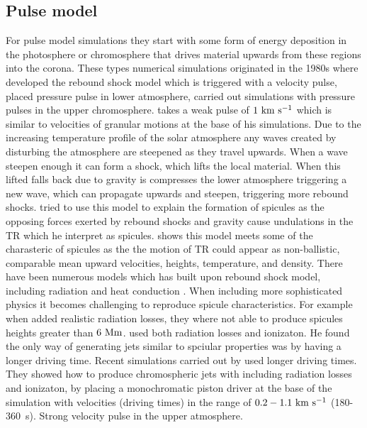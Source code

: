 \subsection{Pulse model}
\label{ssec:pulse_model}
For pulse model simulations they start with some form of energy deposition in the photosphere or chromosphere that drives material upwards from these regions into the corona. These types numerical simulations originated in the 1980s where \cite{Hollweg1982ApJ257345H} developed the rebound shock model which is triggered with a velocity pulse, \cite{Suematsu1982SoPh7599S} placed pressure pulse in lower atmosphere, \cite{Shibata1982} carried out simulations with pressure pulses in the upper chromosphere. \np
%
\cite{Hollweg1982ApJ257345H} takes a weak pulse of $1~\rm{km ~s^{-1}}$ which is similar to velocities of granular motions at the base of his simulations. Due to the increasing temperature profile of the solar atmosphere any waves created by disturbing the atmosphere are steepened as they travel upwards. When a wave steepen enough it can form a shock, which lifts the local material. When this lifted falls back due to gravity is compresses the lower atmosphere triggering a new wave, which can propagate upwards and steepen, triggering more rebound shocks. \cite{Hollweg1982ApJ257345H} tried to use this model to explain the formation of spicules as the opposing forces exerted by rebound shocks and gravity cause undulations in the TR which he interpret as spicules. \cite{Hollweg1982ApJ257345H} shows this model meets some of the charasteric of spicules as the the motion of TR could appear as non-ballistic, comparable mean upward velocities, heights, temperature, and density. There have been numerous models which has built upon rebound shock model, including radiation and heat conduction \citep{Sterling1988ApJ327950S, Sterling1990ApJ349647S, Cheng1992AA266549C, Cheng1992AA262581C, Cheng1992AA266537C}. When including more sophisticated physics it becomes challenging to reproduce spicule characteristics. For example when \cite{Sterling1990ApJ349647S} added realistic radiation losses, they where not able to produce spicules heights greater than $6~\rm{Mm}$. \cite{Cheng1992AA266549C, Cheng1992AA266537C} used both radiation losses and ionizaton. He found the only way of generating jets similar to spciular properties was by having a longer driving time. Recent simulations carried out by \cite{Heggland2007ApJ6661277H} used longer driving times. They showed how to produce chromospheric jets with including radiation losses and ionizaton, by placing a monochromatic piston driver at the base of the simulation with velocities (driving times) in the range of $0.2-1.1~\rm{km ~s^{-1}}$ (180-360~\rm{s}).
%
Strong velocity pulse in the upper atmosphere. 

